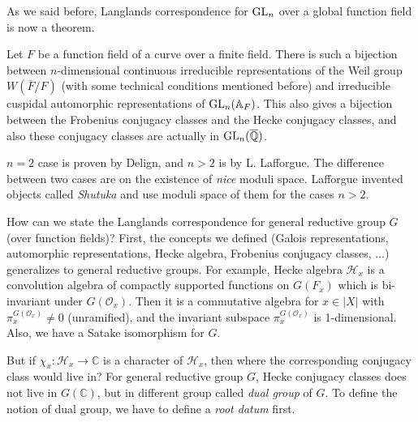 As we said before, Langlands correspondence for $\operatorname{\mathrm{GL}}_n$ over a global function field is now a theorem.
\begin{theorem}
   Let $F$ be a function field of a curve over a finite field.
   There is such a bijection between $n$-dimensional continuous irreducible representations of the Weil group $W(\overline{F}/F)$
   (with some technical conditions mentioned before) and irreducible cuspidal automorphic representations of $\operatorname{\mathrm{GL}}_n(\mathbb{A}_F)$.
   This also gives a bijection between the Frobenius conjugacy classes and the Hecke conjugacy classes, and also these conjugacy classes
   are actually in $\operatorname{\mathrm{GL}}_n(\overline{\mathbb{Q}})$.
\end{theorem}
$n=2$ case is proven by Delign, and $n > 2$ is by L. Lafforgue.
The difference between two cases are on the existence of \emph{nice} moduli space.
Lafforgue invented objects called \emph{Shutuka} and use moduli space of them for the cases $n >2$.


How can we state the Langlands correspondence for general reductive group $G$ (over function fields)?
First, the concepts we defined (Galois representations, automorphic representations, Hecke algebra, Frobenius conjugacy classes, ...)
generalizes to general reductive groups.
For example, Hecke algebra $\mathcal{H}_{x}$ is a convolution algebra of compactly supported functions on $G(F_x)$
which is bi-invariant under $G(\mathcal{O}_{x})$.
Then it is a commutative algebra for $x \in |X|$ with $\pi_x^{G(\mathcal{O}_x)}\neq 0$ (unramified), and
the invariant subspace $\pi_{x}^{G(\mathcal{O}_{x})}$ is 1-dimensional.
Also, we have a Satake isomorphism for $G$.

But if $\chi_x : \mathcal{H}_x \to \mathbb{C}$ is a character of $\mathcal{H}_{x}$, then where the corresponding
conjugacy class would live in?
For general reductive group $G$, Hecke conjugacy classes does not live in $G(\mathbb{C})$, but in different group called \emph{dual group} of $G$.
To define the notion of dual group, we have to define a \emph{root datum} first.

